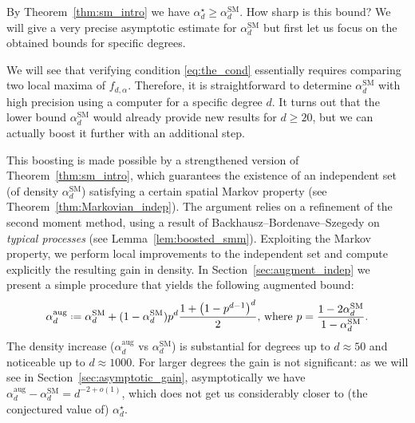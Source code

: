 \documentclass[12pt]{amsart}
\theoremstyle{definition}
\newcommand\al{\alpha}
\newcommand\alstar{\alpha^{\star}}
\newcommand\alsm{\alpha^{\mathrm{SM}}}
\newcommand\alaug{\alpha^{\mathrm{aug}}}
\newcommand{\defeq}{\mathrel{\vcenter{\baselineskip0.5ex \lineskiplimit0pt
                     \hbox{\scriptsize.}\hbox{\scriptsize.}}}%
                     =}
\begin{document}
By Theorem~\ref{thm:sm_intro} we have $\alstar_d \geq \alsm_d$. How sharp is this bound? We will give a very precise asymptotic estimate for $\alsm_d$ but first let us focus on the obtained bounds for specific degrees. 

We will see that verifying condition \eqref{eq:the_cond} essentially requires comparing two local maxima of $f_{d,\al}$. Therefore, it is straightforward to determine $\alsm_d$ with high precision using a computer for a specific degree $d$. It turns out that the lower bound $\alsm_d$ would already provide new results for $d \geq 20$, but we can actually boost it further with an additional step. 

This boosting is made possible by a strengthened version of Theorem~\ref{thm:sm_intro}, which guarantees the existence of an independent set (of density $\alsm_d$) satisfying a certain spatial Markov property (see Theorem~\ref{thm:Markovian_indep}). The argument relies on a refinement of the second moment method, using a result of Backhausz--Bordenave--Szegedy \cite{backhausz2022typicality} on \emph{typical processes} (see Lemma~\ref{lem:boosted_smm}). Exploiting the Markov property, we perform local improvements to the independent set and compute explicitly the resulting gain in density. In Section~\ref{sec:augment_indep} we present a simple procedure that yields the following augmented bound:
%
\begin{equation} \label{eq:al_aug}
\alaug_d \defeq \alsm_d + 
(1-\alsm_d) p^d\frac{1+\big( 1- p^{d-1} \big)^d}{2} 
\text{, where }
p = \frac{1-2\alsm_d}{1-\alsm_d} .
\end{equation}
%
The density increase ($\alaug_d$ vs $\alsm_d$) is substantial for degrees up to $d \approx 50$ and noticeable up to $d \approx 1000$. For larger degrees the gain is not significant: as we will see in Section~\ref{sec:asymptotic_gain}, asymptotically we have $\alaug_d - \alsm_d = d^{-2+o(1)}$, which does not get us considerably closer to (the conjectured value of) $\alstar_d$. 
\end{document}
